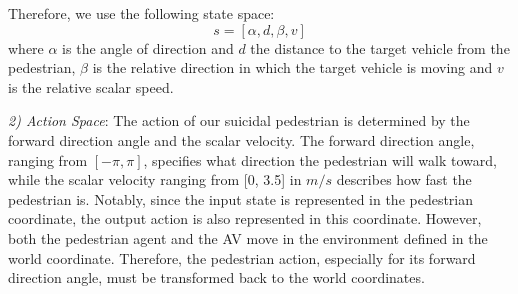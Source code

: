 \documentclass[letterpaper, 10 pt, conference]{ieeeconf}
\begin{document}
Therefore, we use the following state space:
\begin{equation}
    s=[\alpha, d,\beta, v]
\end{equation}
where $\alpha$ is the angle of direction and $d$ the distance to the target vehicle from the pedestrian, $\beta$ is the relative direction in which the target vehicle is moving and $v$ is the relative scalar speed.  

\textit{2) Action Space}: The action of our suicidal pedestrian is determined by the forward direction angle and the scalar velocity. The forward direction angle, ranging from $[-\pi, \pi]$, specifies what direction the pedestrian will walk toward, while the scalar velocity ranging from [0, 3.5] in $m/s$ describes how fast the pedestrian is. Notably, since the input state is represented in the pedestrian coordinate, the output action is also represented in this coordinate. However, both the pedestrian agent and the AV move in the environment defined in the world coordinate. Therefore, the pedestrian action, especially for its forward direction angle, must be transformed back to the world coordinates. %
\end{document}
